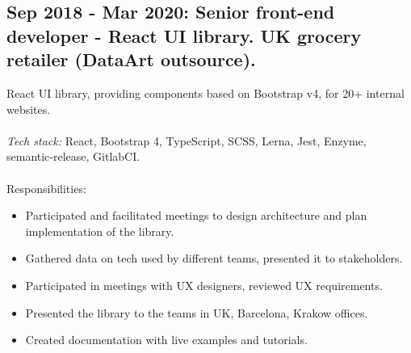\documentclass[a4paper, 14pt]{article}
\begin{document}
  \subsection{Sep 2018 - Mar 2020: Senior front-end developer - React UI library. UK grocery retailer (DataArt outsource).}

  React UI library, providing components based on Bootstrap v4, for 20+ internal websites. \\
  \\
    \textit{Tech stack:} React, Bootstrap 4, TypeScript, SCSS, Lerna, Jest, Enzyme, semantic-release, GitlabCI. \\
  \\
  Responsibilities:
    \begin{itemize}
      \item Participated and facilitated meetings to design architecture and plan implementation of the library. \\
      \item Gathered data on tech used by different teams, presented it to stakeholders. \\
      \item Participated in meetings with UX designers, reviewed UX requirements. \\
      \item Presented the library to the teams in UK, Barcelona, Krakow offices. \\
      \item Created documentation with live examples and tutorials. \\
    \end{itemize}
\end{document}
